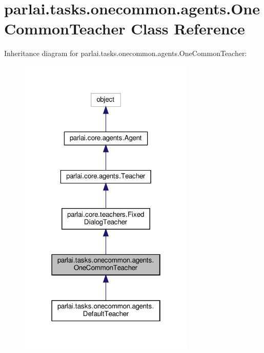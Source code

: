 \hypertarget{classparlai_1_1tasks_1_1onecommon_1_1agents_1_1OneCommonTeacher}{}\section{parlai.\+tasks.\+onecommon.\+agents.\+One\+Common\+Teacher Class Reference}
\label{classparlai_1_1tasks_1_1onecommon_1_1agents_1_1OneCommonTeacher}


Inheritance diagram for parlai.\+tasks.\+onecommon.\+agents.\+One\+Common\+Teacher\+:
\nopagebreak
\begin{figure}[H]
\begin{center}
\leavevmode
\includegraphics[width=238pt]{d3/d1d/classparlai_1_1tasks_1_1onecommon_1_1agents_1_1OneCommonTeacher__inherit__graph}
\end{center}
\end{figure}


